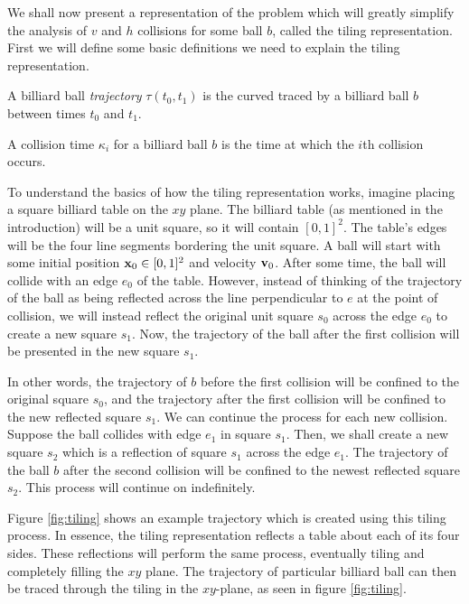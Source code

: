 We shall now present a representation of the problem which will greatly simplify the analysis of $v$ and $h$ collisions for some ball $b$, called the tiling representation. First we will define some basic definitions we need to explain the tiling representation.

\begin{definition}
  A billiard ball \emph{trajectory} $\tau(t_0, t_1)$ is the curved traced by a billiard ball $b$ between times $t_0$ and $t_1$.
\end{definition}

\begin{definition}
  A collision time $\kappa_i$ for a billiard ball $b$ is the time at which the $i$th collision occurs.
\end{definition}

To understand the basics of how the tiling representation works, imagine placing a square billiard table on the $xy$ plane. The billiard table (as mentioned in the introduction) will be a unit square, so it will contain $[0,1]^2$. The table's edges will be the four line segments bordering the unit square. A ball will start with some initial position $\mathbf{x}_0 \in [0,1]^2$ and velocity $\mathbf{v}_0$. After some time, the ball will collide with an edge $e_0$ of the table. However, instead of thinking of the trajectory of the ball as being reflected across the line perpendicular to $e$ at the point of collision, we will instead reflect the original unit square $s_0$ across the edge $e_0$ to create a new square $s_1$. Now, the trajectory of the ball after the first collision will be presented in the new square $s_1$.

In other words, the trajectory of $b$ before the first collision will be confined to the original square $s_0$, and the trajectory after the first collision will be confined to the new reflected square $s_1$. We can continue the process for each new collision. Suppose the ball collides with edge $e_1$ in square $s_1$. Then, we shall create a new square $s_2$ which is a reflection of square $s_1$ across the edge $e_1$. The trajectory of the ball $b$ after the second collision will be confined to the newest reflected square $s_2$. This process will continue on indefinitely.

Figure \ref{fig:tiling} shows an example trajectory which is created using this tiling process. In essence, the tiling representation reflects a table about each of its four sides. These reflections will perform the same process, eventually tiling and completely filling the $xy$ plane. The trajectory of particular billiard ball can then be traced through the tiling in the $xy$-plane, as seen in figure \ref{fig:tiling}.

